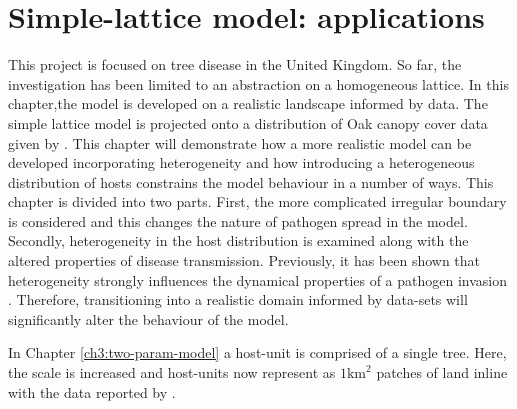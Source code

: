 
\chapter{Simple-lattice model: applications}

This project is focused on tree disease in the United Kingdom. %
So far, the investigation has been limited to an abstraction on a homogeneous lattice. %
In this chapter,the  model is developed on  a realistic landscape informed by data. %
The simple lattice model is projected onto a distribution of Oak canopy cover data given %
by \cite{hill.data}. %
This chapter  will  demonstrate how a more realistic model can be developed %
incorporating heterogeneity and how %
introducing a heterogeneous distribution of hosts constrains the model behaviour %
in a number of ways. %
This chapter is divided into two parts. %
First, the more complicated irregular boundary is considered and this changes the nature of pathogen%
 spread in the model. %
Secondly,  heterogeneity in the host distribution is examined along with the altered properties %
of disease transmission. %
Previously, it has been shown that heterogeneity strongly influences the  dynamical properties %
of a pathogen invasion \cite{madden1995plant}. %
Therefore, transitioning into a realistic domain informed by data-sets will significantly %
alter the  behaviour of the model.  %

In Chapter \ref{ch3:two-param-model} a host-unit is comprised of a single tree. %
Here, the scale is increased and host-units now represent as  $1\mathrm{km}^2$ patches of land \textemdash inline with the data reported by \cite{hill.data}. %



